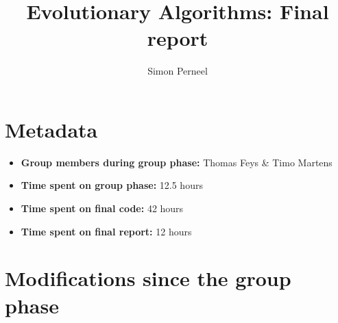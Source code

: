 \documentclass[a4paper,10pt]{article}
\title{Evolutionary Algorithms: Final report}
\author{Simon Perneel}
\newcommand{\nextyear}{\advance\year by 1 \the\year\advance\year by -1}
\newcommand{\deadlineReport}{January 4, \nextyear{} at 16:00 CET}
\newcommand{\RemoveMe}[1]{{\color{purple}#1}}
\begin{document}
\selectfont{}
\setlength\parindent{0pt} %

\maketitle





\section{Metadata}

\begin{itemize}
 \item \textbf{Group members during group phase:} Thomas Feys \& Timo Martens
 \item \textbf{Time spent on group phase:} 12.5 hours
 \item \textbf{Time spent on final code:} 42 hours
 \item \textbf{Time spent on final report:} 12 hours
\end{itemize}

\section{Modifications since the group phase}
\end{document}
